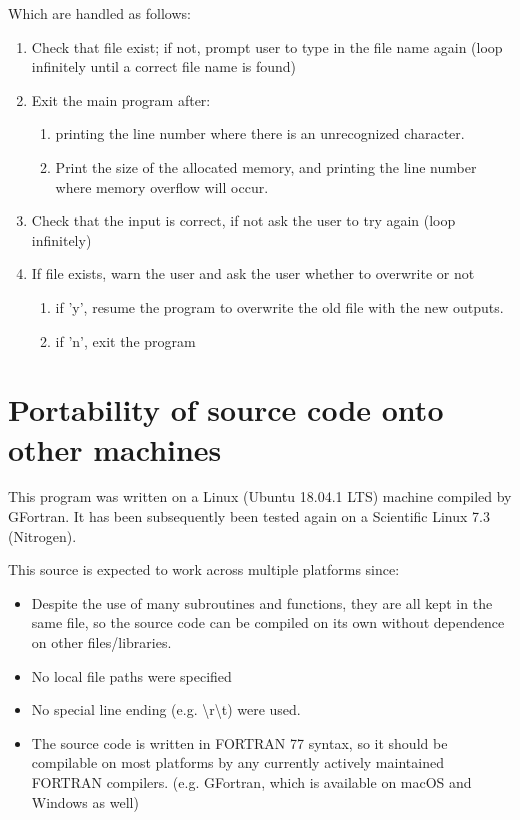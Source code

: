\documentclass[a4paper, 12pt]{article}
\begin{document}
Which are handled as follows:
\begin{enumerate}
	\item Check that file exist; if not, prompt user to type in the file name again (loop infinitely until a correct file name is found)
	\item Exit the main program after:
	\begin{enumerate}
		\item printing the line number where there is an unrecognized character.
		\item Print the size of the allocated memory, and printing the line number where memory overflow will occur.
	\end{enumerate}
	\item Check that the input is correct, if not ask the user to try again (loop infinitely)
	\item If file exists, warn the user and ask the user whether to overwrite or not
	\begin{enumerate}
		\item if 'y', resume the program to overwrite the old file with the new outputs.
		\item if 'n', exit the program
	\end{enumerate}
\end  {enumerate}

\section{Portability of source code onto other machines}
This program was written on a Linux (Ubuntu 18.04.1 LTS) machine compiled by GFortran. It has been subsequently been tested again on a Scientific Linux 7.3 (Nitrogen).

This source is expected to work across multiple platforms since:
\begin{itemize}
	\item Despite the use of many subroutines and functions, they are all kept in the same file, so the source code can be compiled on its own without dependence on other files/libraries.
	\item No local file paths were specified
	\item No special line ending (e.g. \textbackslash r\textbackslash t) were used.
	\item The source code is written in FORTRAN 77 syntax, so it should be compilable on most platforms by any currently actively maintained FORTRAN compilers. (e.g. GFortran, which is available on macOS and Windows as well)
\end{itemize}
\end{document}
